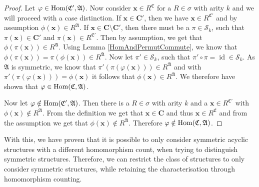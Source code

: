 \begin{proof}
	Let $\varphi\in \operatorname{Hom}(\mathfrak C',\mathfrak A)$.
	Now consider $\mathbf x\in R^{\mathfrak C}$ for a $R\in \sigma$ with arity $k$ and we will proceed with a case distinction.
	If $\mathbf x\in \mathbf{C'}$, then we have $\mathbf x\in R^{\mathfrak C'}$ and by assumption $\phi(\mathbf x)\in R^{\mathfrak A}$.
	If $\mathbf x\in \mathbf C\setminus\mathbf{C'}$, then there must be a $\pi\in \mathcal S_k$, such that $\pi(\mathbf x)\in \mathbf{C'}$ and $\pi(\mathbf x)\in R^{\mathfrak C'}$.
	Then by assumption, we get that $\phi(\pi(\mathbf x))\in R^{\mathfrak A}$.
	Using Lemma \ref{HomAndPermutCommute}, we know that $\phi(\pi(\mathbf x))=\pi(\phi(\mathbf x))\in R^{\mathfrak A}$.
	Now let $\pi'\in \mathcal S_k$, such that $\pi'\circ\pi=\operatorname{id}\in \mathcal S_k$.
	As $\mathfrak A$ is symmetric, we know that $\pi'(\pi(\varphi(\mathbf x)))\in R^{\mathfrak A}$ and with $\pi'(\pi(\varphi(\mathbf x)))=\phi(\mathbf x)$ it follows that $\phi(\mathbf x)\in R^{\mathfrak A}$.
	We therefore have shown that $\varphi\in\operatorname{Hom}(\mathfrak C,\mathfrak A)$.
	
	Now let $\varphi\notin\operatorname{Hom}(\mathfrak C',\mathfrak A)$.
	Then there is a $R\in\sigma$ with arity $k$ and a $\mathbf x\in R^{\mathfrak C'}$ with $\phi(\mathbf x)\notin R^{\mathfrak A}$.
	From the definition we get that $\mathbf x\in \mathbf{C}$ and thus $\mathbf x \in R^{\mathfrak C}$ and from the assumption we get that $\phi(\mathbf x)\notin R^{\mathfrak A}$.
	Therefore $\varphi\notin \operatorname{Hom}(\mathfrak C,\mathfrak A)$.
\end{proof}

With this, we have proven that it is possible to only consider symmetric acyclic structures with a different homomorphism count, when trying to distinguish symmetric structures.
Therefore, we can restrict the class of structures to only consider symmetric structures, while retaining the characterisation through homomorphism counting.



